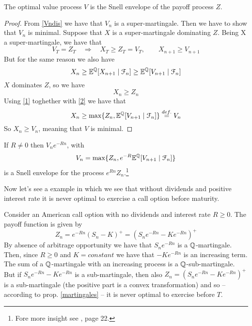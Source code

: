 \begin{theorem}
    The optimal value process $V$ is the Snell envelope of the payoff process $Z$.
\end{theorem}
\begin{proof}
    From \eqref{Vndis} we have that $V_n$ is a super-martingale. Then we have to show that $V_n$ is minimal. Suppose that $X$ is a super-martingale dominating $Z$. Being X a super-martingale, we have that
    \begin{equation*}
        V_T=Z_T \quad\Rightarrow\quad X_T\ge Z_T = V_T, \qquad X_{n+1}\ge V_{n+1}
    \end{equation*}
    But for the same reason we also have 
    \begin{equation}\label{1}
        X_n \ge \mathbb{E}^{\mathbb{Q}}[X_{n+1}\mid\mathcal{F}_n] \ge \mathbb{E}^{\mathbb{Q}}[V_{n+1}\mid\mathcal{F}_n]
    \end{equation}
    $X$ dominates $Z$, so we have 
    \begin{equation}\label{2}
        X_n \ge Z_n
    \end{equation}
    Using \eqref{1} toghether with \eqref{2} we have that 
    \begin{equation*}
        X_n\ge \max\{Z_n,\mathbb{E}^{\mathbb{Q}}[V_{n+1}\mid\mathcal{F}_n]\} \overset{def.}{=} V_n
    \end{equation*}
    So $X_n\ge V_n$, meaning that $V$ is minimal. 
\end{proof}
\begin{remark}
    If $R\ne0$ then $V_n e^{-Rn}$, with 
    \begin{equation}
        V_n = \max\{Z_n, e^{-R}\mathbb{E}^{\mathbb{Q}}[V_{n+1}\mid\mathcal{F}_n]\}
    \end{equation}
    is a Snell envelope for the process $e^{Rn}Z_n$.\footnote{Fore more insight see \cite{lamberton}, page 22.} 
\end{remark}
Now let's see a example in which we see that without dividends and positive interest rate it is never optimal to exercise a call option before maturity.
\begin{example}{}{}
    Consider an American call option with no dividends and interest rate $R\ge0$. The payoff function is given by 
    \begin{equation*}
        Z_n = e^{-Rn}(S_n-K)^+ = (S_n e^{-Rn} - Ke^{-Rn})^+
    \end{equation*}
    By absence of arbitrage opportunity we have that $S_n e^{-Rn}$ is a ${\mathbb{Q}}$-martingale. Then, since $R\ge0$ and $K=constant$ we have that $-Ke^{-Rn}$ is an increasing term. The sum of a ${\mathbb{Q}}$-martingale with an increasing process is a ${\mathbb{Q}}$-sub-martingale. But if $S_n e^{-Rn} - Ke^{-Rn}$ is a sub-martingale, then also $Z_n=(S_n e^{-Rn} - Ke^{-Rn})^+$ is a sub-martingale (the positive part is a convex transformation) and so -- according to prop. \ref{martingales} -- it is never optimal to exercise before $T$. 
\end{example}

